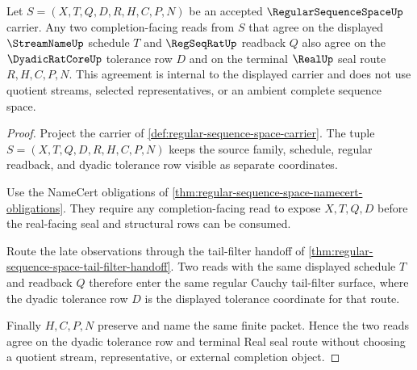 \begin{theorem}
\label{thm:regular-sequence-space-tail-coherence}
Let $S=(X,T,Q,D,R,H,C,P,N)$ be an accepted $\RegularSequenceSpaceUp$ carrier. Any two completion-facing reads from $S$ that agree on the displayed $\StreamNameUp$ schedule $T$ and $\RegSeqRatUp$ readback $Q$ also agree on the $\DyadicRatCoreUp$ tolerance row $D$ and on the terminal $\RealUp$ seal route $R,H,C,P,N$. This agreement is internal to the displayed carrier and does not use quotient streams, selected representatives, or an ambient complete sequence space.
\end{theorem}
\begin{proof}
Project the carrier of \autoref{def:regular-sequence-space-carrier}. The tuple $S=(X,T,Q,D,R,H,C,P,N)$ keeps the source family, schedule, regular readback, and dyadic tolerance row visible as separate coordinates.

Use the NameCert obligations of \autoref{thm:regular-sequence-space-namecert-obligations}. They require any completion-facing read to expose $X,T,Q,D$ before the real-facing seal and structural rows can be consumed.

Route the late observations through the tail-filter handoff of \autoref{thm:regular-sequence-space-tail-filter-handoff}. Two reads with the same displayed schedule $T$ and readback $Q$ therefore enter the same regular Cauchy tail-filter surface, where the dyadic tolerance row $D$ is the displayed tolerance coordinate for that route.

Finally $H,C,P,N$ preserve and name the same finite packet. Hence the two reads agree on the dyadic tolerance row and terminal Real seal route without choosing a quotient stream, representative, or external completion object.
\end{proof}

